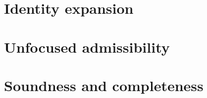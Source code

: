 \section{Identity expansion}

\section{Unfocused admissibility}

\section{Soundness and completeness}


